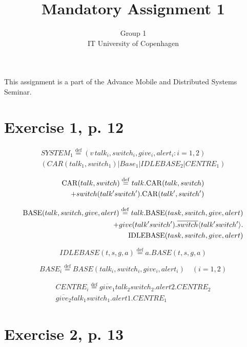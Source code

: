 \documentclass[11pt]{article}
\begin{document}
\title{Mandatory Assignment 1}
\author{Group 1\\
IT University of Copenhagen}
\renewcommand{\today}{September 22, 2012}
\maketitle
This assignment is a part of the Advance Mobile and Distributed Systems Seminar.

\section {Exercise 1, p. 12}

\begin{equation}
\begin{split}
SYSTEM_1 \stackrel{\mathrm{def}}{=} (v\,talk_i , switch_i , give_i , alert_i : i = 1,2) \\
(CAR(talk_1 , switch_1) | Base_1 | IDLEBASE_2 | CENTRE_1)
\end{split}
\end{equation}

\begin{equation}
\begin{split}
{\rm CAR}(talk, switch) \stackrel{\rm def}{=} talk . {\rm CAR}(talk, switch) \\
+ switch(talk' switch') . {\rm CAR}(talk', switch')\\
\end{split}
\end{equation}

\begin{equation}
\begin{split}
{\rm BASE}(talk, switch, give, alert) \stackrel{\rm def}{=} talk . {\rm BASE}(task, switch, give, alert) \\
+ give(talk' switch') . \overline{switch} \langle talk' switch' \rangle . \\
{\rm IDLEBASE}(task, switch, give, alert)
\end{split}
\end{equation}

\begin{equation}
IDLEBASE(t, s, g, a) \stackrel{\mathrm{def}}{=} a.BASE(t,s,g,a)
\end{equation}

\begin{equation}
BASE_i \stackrel{\mathrm{def}}{=} BASE(talk_i , switch_i , give_i , alert_i) \quad (i=1,2)
\end{equation}

\begin{equation}
\begin{split}
CENTRE_i \stackrel{\mathrm{def}}{=} \overline{give_1}talk_2switch_2.alert2.CENTRE_2 \\ 
\overline{give_2}talk_1switch_1.alert1.CENTRE_1 
\end{split}
\end{equation}


\section{Exercise 2, p. 13}

\end{document}
